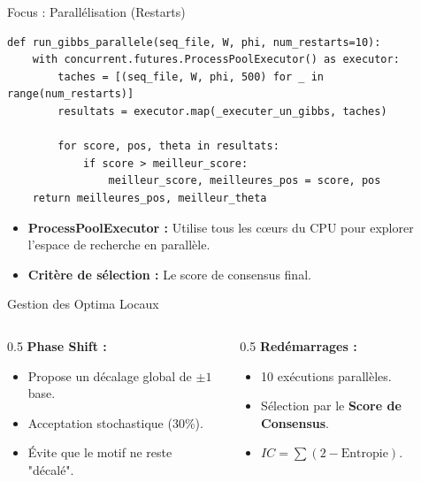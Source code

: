 \documentclass[10pt]{beamer}
\begin{document}
\begin{frame}[fragile]{Focus : Parallélisation (Restarts)}
\begin{lstlisting}
def run_gibbs_parallele(seq_file, W, phi, num_restarts=10):
    with concurrent.futures.ProcessPoolExecutor() as executor:
        taches = [(seq_file, W, phi, 500) for _ in range(num_restarts)]
        resultats = executor.map(_executer_un_gibbs, taches)
        
        for score, pos, theta in resultats:
            if score > meilleur_score:
                meilleur_score, meilleures_pos = score, pos
    return meilleures_pos, meilleur_theta
\end{lstlisting}
\begin{itemize}
    \item \textbf{ProcessPoolExecutor :} Utilise tous les cœurs du CPU pour explorer l'espace de recherche en parallèle.
    \item \textbf{Critère de sélection :} Le score de consensus final.
\end{itemize}
\end{frame}

\begin{frame}{Gestion des Optima Locaux}
    \begin{columns}
        \begin{column}{0.5\textwidth}
            \textbf{Phase Shift :}
            \begin{itemize}
                \item Propose un décalage global de $\pm 1$ base.
                \item Acceptation stochastique (30\%).
                \item Évite que le motif ne reste "décalé".
            \end{itemize}
        \end{column}
        \begin{column}{0.5\textwidth}
            \textbf{Redémarrages :}
            \begin{itemize}
                \item 10 exécutions parallèles.
                \item Sélection par le \textbf{Score de Consensus}.
                \item $IC = \sum (2 - \text{Entropie})$.
            \end{itemize}
        \end{column}
    \end{columns}
\end{frame}
\end{document}
